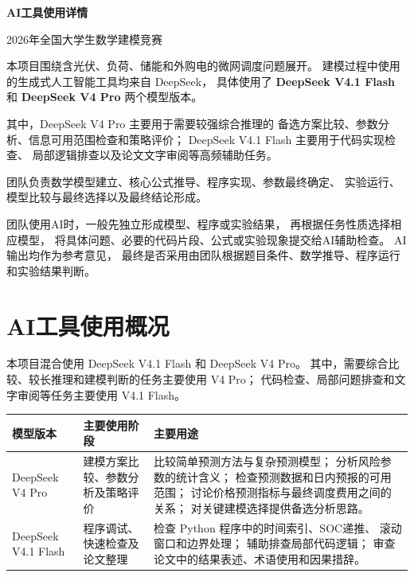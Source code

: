 \documentclass[UTF8,a4paper,11pt]{ctexart}
\begin{document}
\begin{center}
    \vspace*{-0.7cm}

    {\bfseries AI工具使用详情}

    \vspace{0.30cm}

    {\large 2026年全国大学生数学建模竞赛}

    \vspace{0.45cm}

\end{center}

\vspace{0.45cm}

本项目围绕含光伏、负荷、储能和外购电的微网调度问题展开。
建模过程中使用的生成式人工智能工具均来自 DeepSeek，
具体使用了
\textbf{DeepSeek V4.1 Flash}
和
\textbf{DeepSeek V4 Pro}
两个模型版本。

其中，DeepSeek V4 Pro 主要用于需要较强综合推理的
备选方案比较、参数分析、信息可用范围检查和策略评价；
DeepSeek V4.1 Flash 主要用于代码实现检查、
局部逻辑排查以及论文文字审阅等高频辅助任务。

团队负责数学模型建立、核心公式推导、程序实现、参数最终确定、
实验运行、模型比较与最终选择以及最终结论形成。

团队使用AI时，一般先独立形成模型、程序或实验结果，
再根据任务性质选择相应模型，
将具体问题、必要的代码片段、公式或实验现象提交给AI辅助检查。
AI输出均作为参考意见，
最终是否采用由团队根据题目条件、数学推导、程序运行和实验结果判断。

\section{AI工具使用概况}

本项目混合使用 DeepSeek V4.1 Flash 和 DeepSeek V4 Pro。
其中，需要综合比较、较长推理和建模判断的任务主要使用 V4 Pro；
代码检查、局部问题排查和文字审阅等任务主要使用 V4.1 Flash。

\begin{center}
\small
\begin{tabularx}{\textwidth}{
    L{0.22\textwidth}
    L{0.24\textwidth}
    Y
}
\toprule
\textbf{模型版本} &
\textbf{主要使用阶段} &
\textbf{主要用途} \\
\midrule

DeepSeek V4 Pro &
建模方案比较、参数分析及策略评价 &
比较简单预测方法与复杂预测模型；
分析风险参数的统计含义；
检查预测数据和日内预报的可用范围；
讨论价格预测指标与最终调度费用之间的关系；
对关键建模选择提供备选分析思路。 \\

DeepSeek V4.1 Flash &
程序调试、快速检查及论文整理 &
检查 Python 程序中的时间索引、SOC递推、
滚动窗口和边界处理；
辅助排查局部代码逻辑；
审查论文中的结果表述、术语使用和因果措辞。 \\

\bottomrule
\end{tabularx}
\end{center}
\end{document}
